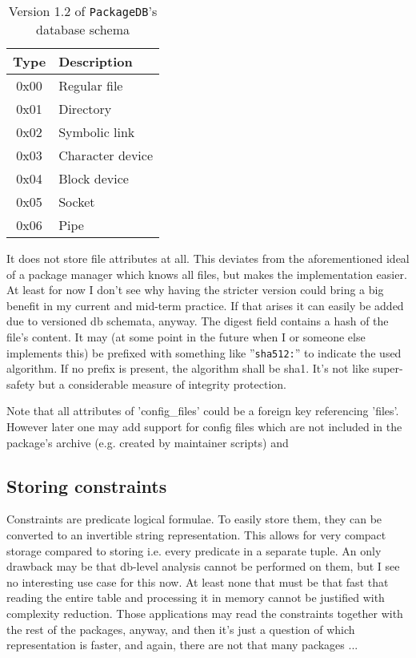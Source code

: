 \documentclass[a4paper]{scrartcl}
\newcommand{\module}[1]{\texttt{#1}}
\begin{document}
\begin{table}[H]
		\vspace{0.5eM}
		\begin{tabular}{c|l}
			Type & Description \\
			\hline
			0x00 & Regular file \\
			0x01 & Directory \\
			0x02 & Symbolic link \\
			0x03 & Character device \\
			0x04 & Block device \\
			0x05 & Socket \\
			0x06 & Pipe \\
		\end{tabular}
	
		\caption{Version 1.2 of \module{PackageDB}'s database schema}
		\label{tab:the_database_schema_of_packagedb}
	\end{table}
	
	It does not store file attributes at all. This deviates from the aforementioned ideal of a package manager which knows all files, but makes the implementation easier. At least for now I don't see why having the stricter version could bring a big benefit in my current and mid-term practice. If that arises it can easily be added due to versioned db schemata, anyway. The digest field contains a hash of the file's content. It may (at some point in the future when I or someone else implements this) be prefixed with something like ''\texttt{sha512:}'' to indicate the used algorithm. If no prefix is present, the algorithm shall be sha1. It's not like super-safety but a considerable measure of integrity protection.
	
	Note that all attributes of 'config\_files' could be a foreign key referencing 'files'. However later one may add support for config files which are not included in the package's archive (e.g. created by maintainer scripts) and 
	
	
	\subsection{Storing constraints}
	\label{ssec:storing_constraints}
	
	Constraints are predicate logical formulae. To easily store them, they can be converted to an invertible string representation. This allows for very compact storage compared to storing i.e. every predicate in a separate tuple. An only drawback may be that db-level analysis cannot be performed on them, but I see no interesting use case for this now. At least none that must be that fast that reading the entire table and processing it in memory cannot be justified with complexity reduction. Those applications may read the constraints together with the rest of the packages, anyway, and then it's just a question of which representation is faster, and again, there are not that many packages ...
	
\end{document}
